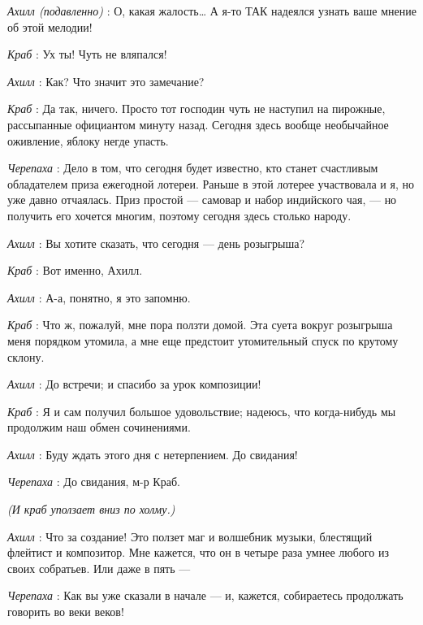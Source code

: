 \emph{Ахилл (подавленно)} : О, какая жалость\ldots{} А я-то ТАК надеялся узнать ваше мнение об этой мелодии!

\emph{Краб} : Ух ты! Чуть не вляпался!

\emph{Ахилл} : Как? Что значит это замечание?

\emph{Краб} : Да так, ничего. Просто тот господин чуть не наступил на пирожные, рассыпанные официантом минуту назад. Сегодня здесь вообще необычайное оживление, яблоку негде упасть.

\emph{Черепаха} : Дело в том, что сегодня будет известно, кто станет счастливым обладателем приза ежегодной лотереи. Раньше в этой лотерее участвовала и я, но уже давно отчаялась. Приз простой --- самовар и набор индийского чая, --- но получить его хочется многим, поэтому сегодня здесь столько народу.

\emph{Ахилл} : Вы хотите сказать, что сегодня --- день розыгрыша?

\emph{Краб} : Вот именно, Ахилл.

\emph{Ахилл} : А-а, понятно, я это запомню.

\emph{Краб} : Что ж, пожалуй, мне пора ползти домой. Эта суета вокруг розыгрыша меня порядком утомила, а мне еще предстоит утомительный спуск по крутому склону.

\emph{Ахилл} : До встречи; и спасибо за урок композиции!

\emph{Краб} : Я и сам получил большое удовольствие; надеюсь, что когда-нибудь мы продолжим наш обмен сочинениями.

\emph{Ахилл} : Буду ждать этого дня с нетерпением. До свидания!

\emph{Черепаха} : До свидания, м-р Краб.

\emph{(И краб уползает вниз по холму.)}

\emph{Ахилл} : Что за создание! Это ползет маг и волшебник музыки, блестящий флейтист и композитор. Мне кажется, что он в четыре раза умнее любого из своих собратьев. Или даже в пять ---

\emph{Черепаха} : Как вы уже сказали в начале --- и, кажется, собираетесь продолжать говорить во веки веков!

